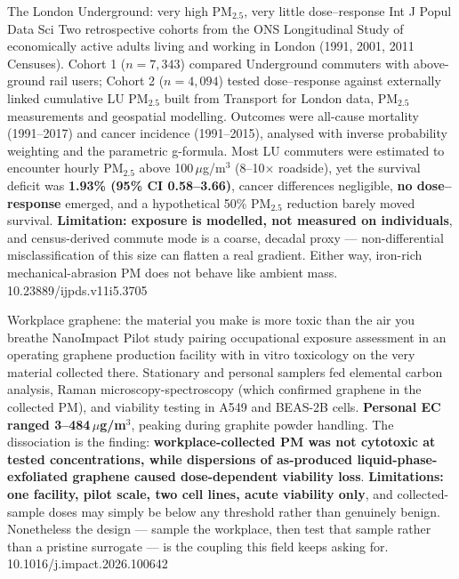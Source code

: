 \documentclass[10pt]{article}
\begin{document}
{The London Underground: very high PM$_{2.5}$, very little dose--response}
{Int J Popul Data Sci}
{Two retrospective cohorts from the ONS Longitudinal Study of economically active adults
living and working in London (1991, 2001, 2011 Censuses). Cohort 1 ($n = 7{,}343$)
compared Underground commuters with above-ground rail users; Cohort 2 ($n = 4{,}094$)
tested dose--response against externally linked cumulative LU PM$_{2.5}$ built from
Transport for London data, PM$_{2.5}$ measurements and geospatial modelling. Outcomes were
all-cause mortality (1991--2017) and cancer incidence (1991--2015), analysed with inverse
probability weighting and the parametric g-formula. Most LU commuters were estimated to
encounter hourly PM$_{2.5}$ above 100\,$\mu$g/m$^3$ (8--10$\times$ roadside), yet the
survival deficit was \textbf{1.93\% (95\% CI 0.58--3.66)}, cancer differences negligible,
\textbf{no dose--response} emerged, and a hypothetical 50\% PM$_{2.5}$ reduction barely
moved survival. \textbf{Limitation: exposure is modelled, not measured on individuals},
and census-derived commute mode is a coarse, decadal proxy --- non-differential
misclassification of this size can flatten a real gradient. Either way, iron-rich
mechanical-abrasion PM does not behave like ambient mass.}
{10.23889/ijpds.v11i5.3705}

{Workplace graphene: the material you make is more toxic than the air you breathe}
{NanoImpact}
{Pilot study pairing occupational exposure assessment in an operating graphene production
facility with in vitro toxicology on the very material collected there. Stationary and
personal samplers fed elemental carbon analysis, Raman microscopy-spectroscopy (which
confirmed graphene in the collected PM), and viability testing in A549 and BEAS-2B cells.
\textbf{Personal EC ranged 3--484\,$\mu$g/m$^3$}, peaking during graphite powder handling.
The dissociation is the finding: \textbf{workplace-collected PM was not cytotoxic at
tested concentrations, while dispersions of as-produced liquid-phase-exfoliated graphene
caused dose-dependent viability loss}. \textbf{Limitations: one facility, pilot scale, two
cell lines, acute viability only}, and collected-sample doses may simply be below any
threshold rather than genuinely benign. Nonetheless the design --- sample the workplace,
then test that sample rather than a pristine surrogate --- is the coupling this field keeps
asking for.}
{10.1016/j.impact.2026.100642}
\end{document}
